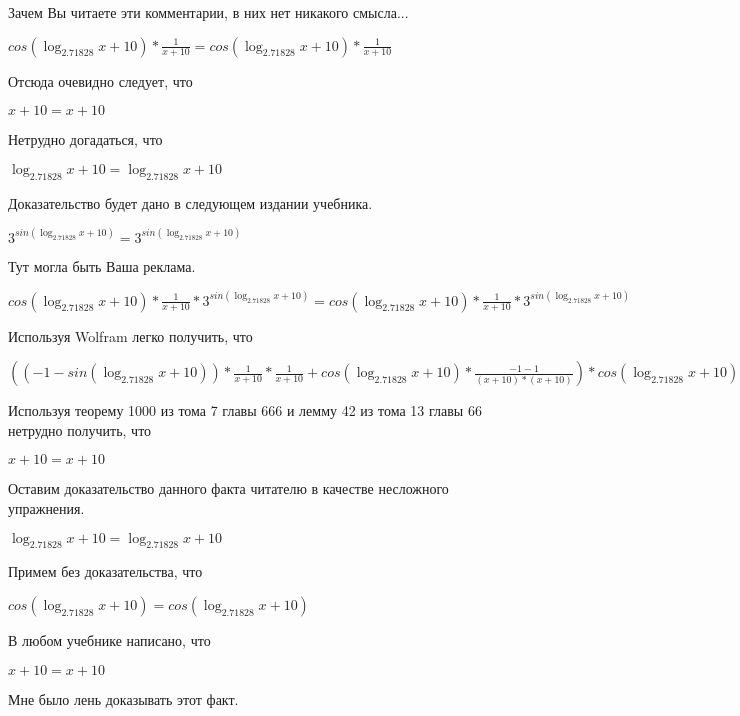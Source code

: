 \documentclass[12pt,a4paper,fleqn]{article}
\theoremstyle{definition}
\begin{document}
Зачем Вы читаете эти комментарии, в них нет никакого смысла... 

$cos(\log_{ 2.71828 }{ x  +  10 }) * \frac{ 1 }{ x  +  10 }
 = cos(\log_{ 2.71828 }{ x  +  10 }) * \frac{ 1 }{ x  +  10 }
$

Отсюда очевидно следует, что 

$ x  +  10  =  x  +  10 $

Нетрудно догадаться, что 

$\log_{ 2.71828 }{ x  +  10 } = \log_{ 2.71828 }{ x  +  10 }$

Доказательство будет дано в следующем издании учебника. 

${ 3 }^{sin(\log_{ 2.71828 }{ x  +  10 })} = { 3 }^{sin(\log_{ 2.71828 }{ x  +  10 })}$

Тут могла быть Ваша реклама. 

$cos(\log_{ 2.71828 }{ x  +  10 }) * \frac{ 1 }{ x  +  10 }
 * { 3 }^{sin(\log_{ 2.71828 }{ x  +  10 })} = cos(\log_{ 2.71828 }{ x  +  10 }) * \frac{ 1 }{ x  +  10 }
 * { 3 }^{sin(\log_{ 2.71828 }{ x  +  10 })}$

Используя Wolfram легко получить, что 

$(( -1  - sin(\log_{ 2.71828 }{ x  +  10 })) * \frac{ 1 }{ x  +  10 }
 * \frac{ 1 }{ x  +  10 }
 + cos(\log_{ 2.71828 }{ x  +  10 }) * \frac{ -1  -  1 }{( x  +  10 ) * ( x  +  10 )}
) * cos(\log_{ 2.71828 }{ x  +  10 }) * \frac{ 1 }{ x  +  10 }
 * { 3 }^{sin(\log_{ 2.71828 }{ x  +  10 })} = (( -1  - sin(\log_{ 2.71828 }{ x  +  10 })) * \frac{ 1 }{ x  +  10 }
 * \frac{ 1 }{ x  +  10 }
 + cos(\log_{ 2.71828 }{ x  +  10 }) * \frac{ -1  -  1 }{( x  +  10 ) * ( x  +  10 )}
) * cos(\log_{ 2.71828 }{ x  +  10 }) * \frac{ 1 }{ x  +  10 }
 * { 3 }^{sin(\log_{ 2.71828 }{ x  +  10 })}$

Используя теорему 1000 из тома 7 главы 666 и лемму 42 из тома 13 главы 66 нетрудно получить, что 

$ x  +  10  =  x  +  10 $

Оставим доказательство данного факта читателю в качестве несложного упражнения. 

$\log_{ 2.71828 }{ x  +  10 } = \log_{ 2.71828 }{ x  +  10 }$

Примем без доказательства, что 

$cos(\log_{ 2.71828 }{ x  +  10 }) = cos(\log_{ 2.71828 }{ x  +  10 })$

В любом учебнике написано, что 

$ x  +  10  =  x  +  10 $

Мне было лень доказывать этот факт.
\end{document}
